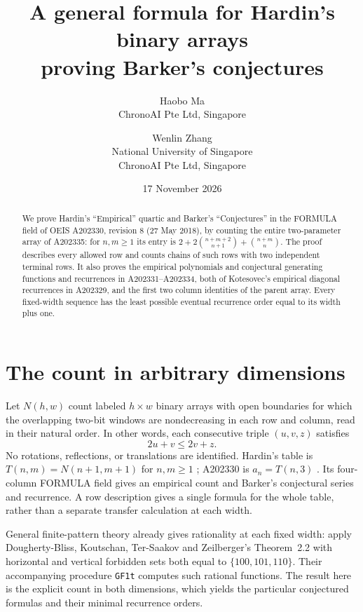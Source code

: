 \documentclass[11pt]{article}
\title{A general formula for Hardin's binary arrays\protect\\ proving Barker's conjectures}
\author{Haobo Ma\\\small ChronoAI Pte Ltd, Singapore
\and Wenlin Zhang\\\small National University of Singapore\\\small ChronoAI Pte Ltd, Singapore}
\date{17 November 2026}
\newcommand{\bin}[2]{\binom{#1}{#2}}
\begin{document}
\maketitle
\begin{abstract}
We prove Hardin's ``Empirical'' quartic and Barker's ``Conjectures'' in the FORMULA field of OEIS A202330, revision 8 (27 May 2018), by counting the entire two-parameter array of A202335: for $n,m\ge1$ its entry is
$2+2\bin{n+m+2}{n+1}+\bin{n+m}{n}$.
The proof describes every allowed row and counts chains of such rows with two independent terminal rows. It also proves the empirical polynomials and conjectural generating functions and recurrences in A202331--A202334, both of Kotesovec's empirical diagonal recurrences in A202329, and the first two column identities of the parent array. Every fixed-width sequence has the least possible eventual recurrence order equal to its width plus one.
\end{abstract}

\section{The count in arbitrary dimensions}
Let $N(h,w)$ count labeled $h\times w$ binary arrays with open boundaries for which the overlapping two-bit windows are nondecreasing in each row and column, read in their natural order. In other words, each consecutive triple $(u,v,z)$ satisfies
\begin{equation}\label{eq:local}
                       2u+v\le2v+z.
\end{equation}
No rotations, reflections, or translations are identified. Hardin's table is
$T(n,m)=N(n+1,m+1)$ for $n,m\ge1$ \cite{parent}; A202330 is $a_n=T(n,3)$ \cite{primary}. Its four-column FORMULA field gives an empirical count and Barker's conjectural series and recurrence. A row description gives a single formula for the whole table, rather than a separate transfer calculation at each width.

General finite-pattern theory already gives rationality at each fixed width: apply Dougherty-Bliss, Koutschan, Ter-Saakov and Zeilberger's Theorem~2.2 \cite{patterns} with horizontal and vertical forbidden sets both equal to $\{100,101,110\}$. Their accompanying procedure \texttt{GF1t} computes such rational functions. The result here is the explicit count in both dimensions, which yields the particular conjectured formulas and their minimal recurrence orders.
\end{document}
